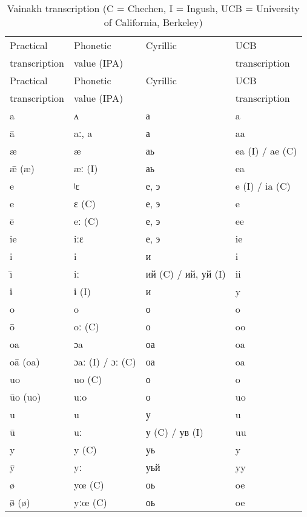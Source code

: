 \begin{longtable}{llll}
\caption{Vainakh transcription (C = Chechen, I = Ingush, UCB = University of California, Berkeley)} \\
\lsptoprule
Practical & Phonetic & Cyrillic & UCB  \\
transcription & value (IPA) &  & transcription \\
\midrule\endfirsthead
\midrule
Practical & Phonetic & Cyrillic & UCB  \\
transcription & value (IPA) &  & transcription \\
\midrule\endhead
	a & ʌ & а & a \\
	\={a} & aː, a & а & aa \\
	æ & æ & аь & ea (I) / ae (C) \\
	\={æ} (æ) & æː (I) & аь & ea \\
	e & ʲɛ & е, э & e (I) / ia (C) \\
	e & ɛ (C) & е, э & e \\
	\={e} & eː (C) & е, э & ee \\
	ie & iːɛ & е, э & ie \\
	i & i & и & i \\
	\={\i} & iː & ий (C) / ий, уй (I) & ii \\
	ɨ & ɨ (I) & и & y \\
	o & o & о & o \\
	\={o} & oː (C) & о & oo \\
	oa & ɔa & оа & oa \\
	o\={a} (oa) & ɔaː (I) / ɔː (C) & оа & oa \\
	uo  & uo (C) & о & o \\
	\={u}o (uo)  & uːo & о & uo \\
	u  & u & у & u \\
	\={u}  & uː & у (C) / ув (I) & uu \\
	y  & y (C) & уь & y \\
	\={y}  & yː & уьй & yy \\
	ø  & yœ (C) & оь & oe \\
	\={ø} (ø) & yːœ (C) & оь & oe \\
	

\end{longtable}
